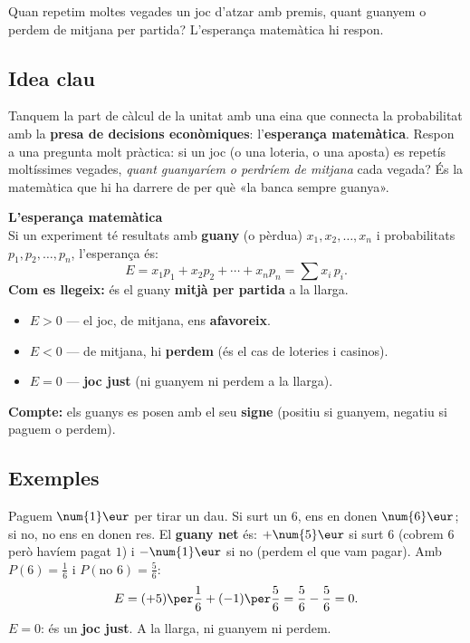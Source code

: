 %
{Quan repetim moltes vegades un joc d'atzar amb premis, quant guanyem o perdem de mitjana per partida? L'esperança matemàtica hi respon.}

\subsection{Idea clau}

Tanquem la part de càlcul de la unitat amb una eina que connecta la probabilitat amb la
\textbf{presa de decisions econòmiques}: l'\textbf{esperança matemàtica}. Respon a una
pregunta molt pràctica: si un joc (o una loteria, o una aposta) es repetís moltíssimes
vegades, \emph{quant guanyaríem o perdríem de mitjana} cada vegada? És la matemàtica que
hi ha darrere de per què «la banca sempre guanya».

\begin{idea}
\textbf{L'esperança matemàtica}\\
Si un experiment té resultats amb \textbf{guany} (o pèrdua) $x_1, x_2, \dots, x_n$ i
probabilitats $p_1, p_2, \dots, p_n$, l'esperança és:
\[
E = x_1 p_1 + x_2 p_2 + \cdots + x_n p_n = \sum x_i\, p_i.
\]
\textbf{Com es llegeix:} és el guany \textbf{mitjà per partida} a la llarga.
\begin{itemize}[leftmargin=1.4em, itemsep=1pt]
  \item $E>0$ — el joc, de mitjana, ens \textbf{afavoreix}.
  \item $E<0$ — de mitjana, hi \textbf{perdem} (és el cas de loteries i casinos).
  \item $E=0$ — \textbf{joc just} (ni guanyem ni perdem a la llarga).
\end{itemize}
\textbf{Compte:} els guanys es posen amb el seu \textbf{signe} (positiu si guanyem,
negatiu si paguem o perdem).
\end{idea}

\subsection{Exemples}

\begin{exemple}
Paguem $\num{1}\eur$ per tirar un dau. Si surt un $6$, ens en donen $\num{6}\eur$; si
no, no ens en donen res. El \textbf{guany net} és: $+\num{5}\eur$ si surt $6$ (cobrem
$6$ però havíem pagat $1$) i $-\num{1}\eur$ si no (perdem el que vam pagar). Amb
$P(6)=\frac{1}{6}$ i $P(\text{no }6)=\frac{5}{6}$:
\[
E = (+5)\per\frac{1}{6} + (-1)\per\frac{5}{6} = \frac{5}{6}-\frac{5}{6}=0.
\]
$E=0$: és un \textbf{joc just}. A la llarga, ni guanyem ni perdem.
\end{exemple}

